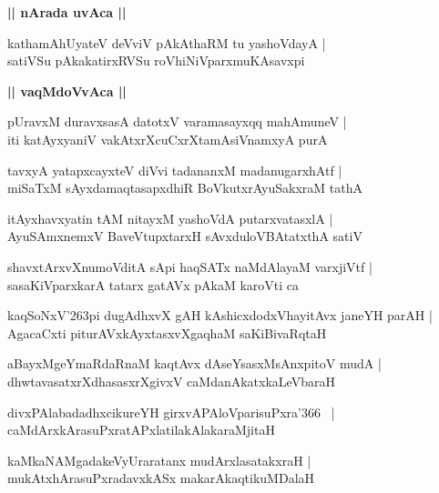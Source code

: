 \documentclass[twoside,12pt,openright]{book}
\def\S{\char'263}
\newcounter{shloka}[chapter]
\def\uvaca#1{\centerline{{\large\textbf{#1}}}}
\begin{document}
\uvaca{|| nArada uvAca ||}

\begin{shloka}%
kathamAhUyateV deVviV pAkAthaRM tu yashoVdayA |\\
satiVSu pAkakatirxRVSu roVhiNiVparxmuKAsavxpi
\end{shloka}

\uvaca{|| vaqMdoVvAca ||}

\begin{shloka}%
pUravxM duravxsasA datotxV varamasayxqq mahAmuneV |\\
iti katAyxyaniV vakAtxrXcuCxrXtamAsiVnamxyA purA 
\end{shloka}

\begin{shloka}%
tavxyA yatapxcayxteV diVvi tadananxM madanugarxhAtf |\\
miSaTxM sAyxdamaqtasapxdhiR BoVkutxrAyuSakxraM tathA 
\end{shloka}

\begin{shloka}%
itAyxhavxyatin tAM nitayxM yashoVdA putarxvatasxlA |\\
AyuSAmxnemxV BaveVtupxtarxH sAvxduloVBAtatxthA satiV 
\end{shloka}

\begin{shloka}%
shavxtArxvXnumoVditA sApi haqSATx naMdAlayaM varxjiVtf |\\
sasaKiVparxkarA tatarx gatAVx pAkaM karoVti ca 
\end{shloka}

\begin{shloka}%
kaqSoNxV\S pi dugAdhxvX gAH kAshicxdodxVhayitAvx janeYH parAH |\\
AgacaCxti piturAVxkAyxtasxvXgaqhaM saKiBivaRqtaH 
\end{shloka}

\begin{shloka}%
aBayxMgeYmaRdaRnaM kaqtAvx dAseYsasxMsAnxpitoV mudA |\\
dhwtavasatxrXdhasasxrXgivxV caMdanAkatxkaLeVbaraH 
\end{shloka}

\begin{shloka}%
divxPAlabadadhxcikureYH girxvAPAloVparisuPxra\char'366 ~|\\
caMdArxkArasuPxratAPxlatilakAlakaraMjitaH
\end{shloka}

\begin{shloka}%
kaMkaNAMgadakeVyUraratanx mudArxlasatakxraH |\\
mukAtxhArasuPxradavxkASx makarAkaqtikuMDalaH 
\end{shloka}
\end{document}

